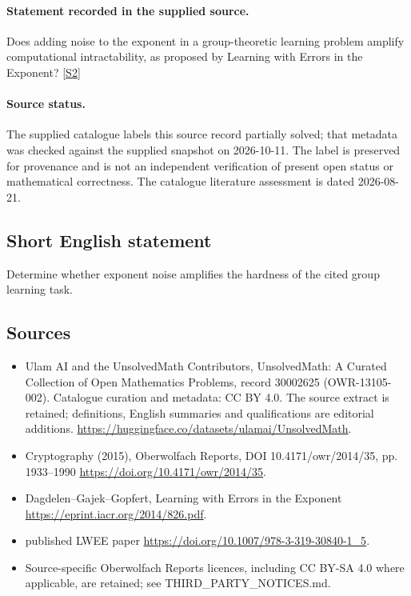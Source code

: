 \documentclass[11pt]{article}
\begin{document}
\paragraph{Statement recorded in the supplied source.}
Does adding noise to the exponent in a group-theoretic learning problem amplify computational intractability, as proposed by Learning with Errors in the Exponent? \href{https://doi.org/10.4171/owr/2014/35}{[S2]}
\paragraph{Source status.}
The supplied catalogue labels this source record partially solved; that metadata was checked against the supplied snapshot on 2026-10-11. The label is preserved for provenance and is not an independent verification of present open status or mathematical correctness. The catalogue literature assessment is dated 2026-08-21.
\subsection{Short English statement}
Determine whether exponent noise amplifies the hardness of the cited group learning task.
\subsection{Sources}
\begin{itemize}
\item[S1] Ulam AI and the UnsolvedMath Contributors, UnsolvedMath: A Curated Collection of Open Mathematics Problems, record 30002625 (OWR-13105-002). Catalogue curation and metadata: CC BY 4.0. The source extract is retained; definitions, English summaries and qualifications are editorial additions.
\url{https://huggingface.co/datasets/ulamai/UnsolvedMath}.
\item[S2] Cryptography (2015), Oberwolfach Reports, DOI 10.4171/owr/2014/35, pp. 1933--1990
\url{https://doi.org/10.4171/owr/2014/35}.
\item[S3] Dagdelen--Gajek--Gopfert, Learning with Errors in the Exponent
\url{https://eprint.iacr.org/2014/826.pdf}.
\item[S4] published LWEE paper
\url{https://doi.org/10.1007/978-3-319-30840-1_5}.
\item Source-specific Oberwolfach Reports licences, including CC BY-SA 4.0 where applicable, are retained; see THIRD\_PARTY\_NOTICES.md.
\end{itemize}
\end{document}
